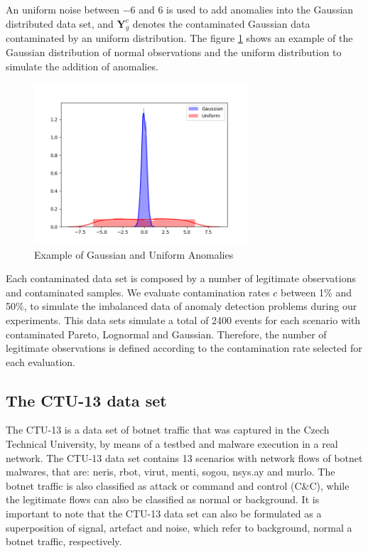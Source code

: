 An uniform noise between $-6$ and $6$ is used to add anomalies into the Gaussian distributed data set, and $\pmb{Y}_g^c$ denotes the contaminated Gaussian data contaminated by an uniform distribution. The figure \ref{fig:4.04} shows an example of the Gaussian distribution of normal observations and the uniform distribution to simulate the addition of anomalies.

\begin{figure}[h!]
	\centering
	\includegraphics[width=8cm]{figures/ch4/4_Xgu2.png}
	\caption{Example of Gaussian and Uniform Anomalies}
	\label{fig:4.04}
\end{figure}

Each contaminated data set is composed by a number of legitimate observations and contaminated samples. We evaluate contamination rates $c$ between 1\% and 50\%, to simulate the imbalanced data of anomaly detection problems during our experiments. This data sets simulate a total of 2400 events for each scenario with contaminated Pareto, Lognormal and Gaussian. Therefore, the number of legitimate observations is defined according to the contamination rate selected for each evaluation.


\subsection{The CTU-13 data set}
\label{sec:4_CTU-13}

The CTU-13 \cite{garcia2014empirical} is a data set of botnet traffic that was captured in the Czech Technical University, by means of a testbed and malware execution in a real network. The CTU-13 data set contains 13 scenarios with network flows of botnet malwares, that are: neris, rbot, virut, menti, sogou, nsys.ay and murlo. The botnet traffic is also classified as attack or command and control (C\&C), while the legitimate flows can also be classified as normal or background. It is important to note that the CTU-13 data set can also be formulated as a superposition of signal, artefact and noise, which refer to background, normal a botnet traffic, respectively.

